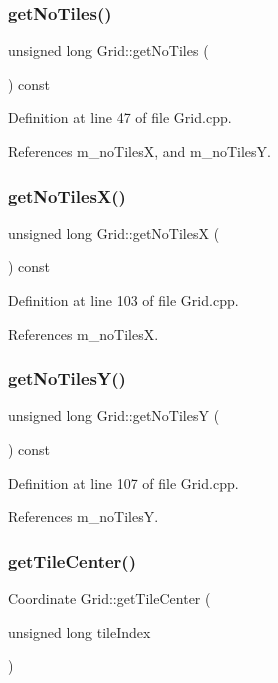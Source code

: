 \subsubsection{getNoTiles()}
{\footnotesize\ttfamily unsigned long Grid\+::get\+No\+Tiles (\begin{DoxyParamCaption}{ }\end{DoxyParamCaption}) const}



Definition at line 47 of file Grid.\+cpp.



References m\+\_\+no\+TilesX, and m\+\_\+no\+TilesY.

\mbox{\label{class_grid_af29c0c404a908aa46f83afb17d7609a6}} 
\subsubsection{getNoTilesX()}
{\footnotesize\ttfamily unsigned long Grid\+::get\+No\+TilesX (\begin{DoxyParamCaption}{ }\end{DoxyParamCaption}) const}



Definition at line 103 of file Grid.\+cpp.



References m\+\_\+no\+TilesX.

\mbox{\label{class_grid_a783a3153d03154cfd33e6a418bb8d390}} 
\subsubsection{getNoTilesY()}
{\footnotesize\ttfamily unsigned long Grid\+::get\+No\+TilesY (\begin{DoxyParamCaption}{ }\end{DoxyParamCaption}) const}



Definition at line 107 of file Grid.\+cpp.



References m\+\_\+no\+TilesY.

\mbox{\label{class_grid_a4ad0db8034762fd6ca0c61df98bcc15f}} 
\subsubsection{getTileCenter()}
{\footnotesize\ttfamily Coordinate Grid\+::get\+Tile\+Center (\begin{DoxyParamCaption}\item[{unsigned long}]{tile\+Index }\end{DoxyParamCaption})}



